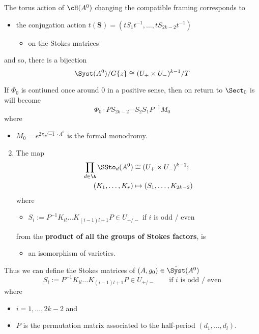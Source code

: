 \begin{paracol}{2}
\begin{thm}
    \begin{cor}
      The torus action of $\cH(A^0)$ changing the compatible framing
      corresponds to
      \begin{itemize}
        \item the conjugation action
          $t(\textbf{S})=(tS_1t^{-1},\dots,tS_{2k-2}t^{-1})$
          \begin{itemize}
            \item on the Stokes matrices
          \end{itemize}
      \end{itemize}
      and so, there is a bijection
      \[
        \Syst(A^0)/G\{z\}\cong(U_+\times U_-)^{k-1}/T
      \]
    \end{cor}
    \begin{cor}
      If $\Phi_0$ is contiuned once around $0$ in a positive sense, then on
      return to $\Sect_0$ is will become
      \[
        \Phi_0\cdot PS_{2k-2}\cdots S_2S_1P^{-1}M_0
      \]
      where
      \begin{itemize}
        \item $M_0=e^{2\pi\sqrt{-1}\cdot\Lambda^0}$ is the formal monodromy.
      \end{itemize}
    \end{cor}
  \end{thm}
  \switchcolumn %
  \begin{lem}
    \begin{enumerate}
      \setcounter{enumi}{1}
      \item The map
        \begin{align*}
          \prod_{d\in\A}\SSto_d(A^0)&\cong (U_+\times U_-)^{k-1} ;
          \\(K_1,\dots,K_r)&\mapsto (S_1,\dots,K_{2k-2})
        \end{align*}
        where
        \begin{itemize}
          \item $S_i:=P^{-1}K_{il}\dots K_{(i-1)l+1}P\in U_{+/-}$ if $i$ is
            odd / even
        \end{itemize}
        from the \textbf{product of all the groups of
        Stokes factors}, is
        \begin{itemize}
          \item an isomorphism of varieties.
        \end{itemize}
    \end{enumerate}
  \end{lem}
  Thus we can define the Stokes matrices of $(A,g_0)\in\hat\Syst(A^0)$
  \[
    S_i:=P^{-1}K_{il}\dots K_{(i-1)l+1}P\in U_{+/-}
    \qquad
    \text{if } i \text{ is odd / even}
  \]
  where
  \begin{itemize}
    \item $i=1,\dots,2k-2$ and
    \item $P$ is the permutation matrix associated to the half-period
      $(d_1,\dots,d_l)$.
  \end{itemize}
\end{paracol} %

